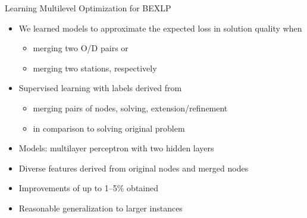 \documentclass[aspectratio=1610]{beamer}
\newcommand{\important}[1]{{\color{green!60!black}#1}}
\begin{document}
\begin{frame}{Learning Multilevel Optimization for BEXLP}
	\citep{tomandl-24}

	\bigskip
	\begin{itemize}
		\itemsep2ex
		\item We \important{learned models to approximate the expected loss in solution quality} when
		\begin{itemize}
			\item merging two O/D pairs or 
			\item merging two stations, respectively
		\end{itemize} 
		\item Supervised learning with labels derived from
		\begin{itemize}
			\item merging pairs of nodes, solving, extension/refinement
			\item in comparison to solving original problem
		\end{itemize} 
		\item Models: multilayer perceptron with two hidden layers
		\item Diverse features derived from original nodes and merged nodes
		\item \important{Improvements of up to 1--5\% obtained}
		\item \important{Reasonable generalization to larger instances}
	\end{itemize}
\end{frame}

\end{document}
